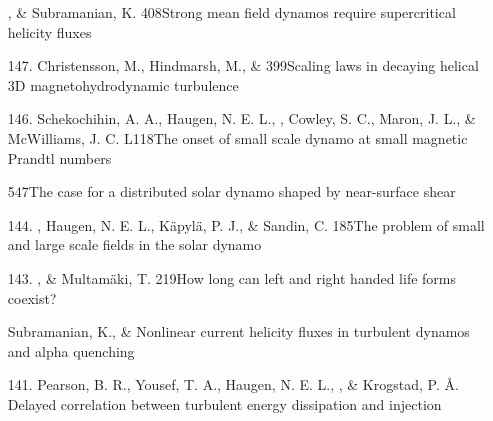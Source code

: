 \begin{itemize}
\item[\relevant {148.}]
\Brandenburg, \& Subramanian, K.
{408}{Strong mean field dynamos require supercritical helicity fluxes}

\item[{147.}]
Christensson, M., Hindmarsh, M., \& \Brandenburg{}
{399}{Scaling laws in decaying helical 3D magnetohydrodynamic turbulence}

\item[{146.}]
Schekochihin, A. A., Haugen, N. E. L., \Brandenburg, Cowley, S. C., Maron, J. L., \& McWilliams, J. C.
{L118}{The onset of small scale dynamo at small magnetic Prandtl numbers}

\item[\important \relevant {145.}]
\Brandenburg{}
{547}{The case for a distributed solar dynamo shaped by near-surface shear}

\item[{144.}]
\Brandenburg, Haugen, N. E. L., K\"apyl\"a, P. J., \& Sandin, C.
{185}{The problem of small and large scale fields in the solar dynamo}

\item[143.]
\Brandenburg, \& Multam\"aki, T.
{219}{How long can left and right handed life forms coexist?}

\item[\relevant {142.}]
Subramanian, K., \& \Brandenburg{}
{Nonlinear current helicity fluxes in turbulent dynamos and alpha quenching}

\item[{141.}]
Pearson, B. R., Yousef, T. A., Haugen, N. E. L., \Brandenburg, \&
Krogstad, P. \AA.
{Delayed correlation between turbulent energy dissipation and injection}


\end{itemize}
